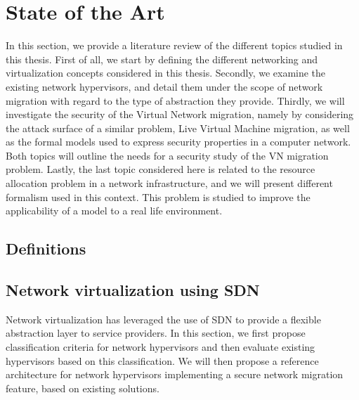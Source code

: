 \documentclass[a4paper, 11pt]{report}
\theoremstyle{definition}
\begin{document}
\newpage
\chapter{State of the Art}
\label{sec:sota}
In this section, we provide a literature review of the different topics studied in this thesis.
First of all, we start by defining the different networking and virtualization concepts considered in this thesis.
Secondly, we examine the existing network hypervisors, and detail them under the scope of network migration with regard to the type of abstraction they provide.
Thirdly, we will investigate the security of the Virtual Network migration, namely by considering the attack surface of a similar problem, Live Virtual Machine migration, as well as the formal models used to express security properties in a computer network.
Both topics will outline the needs for a security study of the VN migration problem.
Lastly, the last topic considered here is related to the resource allocation problem in a network infrastructure, and we will present different formalism used in this context.
This problem is studied to improve the applicability of a model to a real life environment.

\section{Definitions}
\label{sec:basic_def}


\newpage
\section{Network virtualization using SDN}

Network virtualization has leveraged the use of SDN to provide a flexible abstraction layer to service providers. In this section, we first propose classification criteria for network hypervisors and then evaluate existing hypervisors based on this classification. We will then propose a reference architecture for network hypervisors implementing a secure network migration feature, based on existing solutions.










\end{document}
